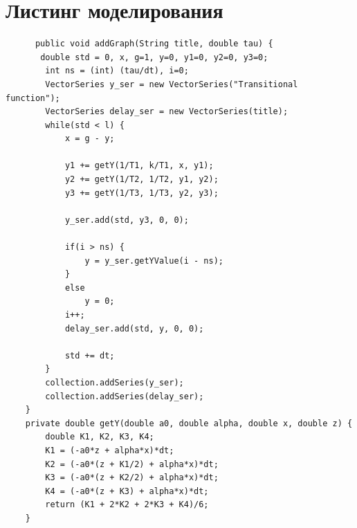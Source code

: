 \documentclass[12pt]{article}
\begin{document}
\section{Листинг моделирования}
\begin{lstlisting}
      public void addGraph(String title, double tau) {
       double std = 0, x, g=1, y=0, y1=0, y2=0, y3=0;
        int ns = (int) (tau/dt), i=0;
        VectorSeries y_ser = new VectorSeries("Transitional function");
        VectorSeries delay_ser = new VectorSeries(title);
        while(std < l) {
            x = g - y;

            y1 += getY(1/T1, k/T1, x, y1);
            y2 += getY(1/T2, 1/T2, y1, y2);
            y3 += getY(1/T3, 1/T3, y2, y3);

            y_ser.add(std, y3, 0, 0);

            if(i > ns) {
                y = y_ser.getYValue(i - ns);
            }
            else
                y = 0;
            i++;
            delay_ser.add(std, y, 0, 0);

            std += dt;
        }
        collection.addSeries(y_ser);
        collection.addSeries(delay_ser);
    }
    private double getY(double a0, double alpha, double x, double z) {
        double K1, K2, K3, K4;
        K1 = (-a0*z + alpha*x)*dt;
        K2 = (-a0*(z + K1/2) + alpha*x)*dt;
        K3 = (-a0*(z + K2/2) + alpha*x)*dt;
        K4 = (-a0*(z + K3) + alpha*x)*dt;
        return (K1 + 2*K2 + 2*K3 + K4)/6;
    }
\end{lstlisting}
\newpage
\end{document}
